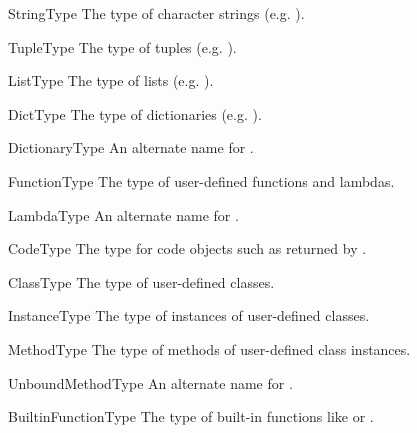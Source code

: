 \begin{datadesc}{StringType}
The type of character strings (e.g. ).
\end{datadesc}

\begin{datadesc}{TupleType}
The type of tuples (e.g. ).
\end{datadesc}

\begin{datadesc}{ListType}
The type of lists (e.g. \code{[0, 1, 2, 3]}).
\end{datadesc}

\begin{datadesc}{DictType}
The type of dictionaries (e.g. ).
\end{datadesc}

\begin{datadesc}{DictionaryType}
An alternate name for .
\end{datadesc}

\begin{datadesc}{FunctionType}
The type of user-defined functions and lambdas.
\end{datadesc}

\begin{datadesc}{LambdaType}
An alternate name for .
\end{datadesc}

\begin{datadesc}{CodeType}
The type for code objects such as returned by
.
\end{datadesc}

\begin{datadesc}{ClassType}
The type of user-defined classes.
\end{datadesc}

\begin{datadesc}{InstanceType}
The type of instances of user-defined classes.
\end{datadesc}

\begin{datadesc}{MethodType}
The type of methods of user-defined class instances.
\end{datadesc}

\begin{datadesc}{UnboundMethodType}
An alternate name for .
\end{datadesc}

\begin{datadesc}{BuiltinFunctionType}
The type of built-in functions like  or
.
\end{datadesc}

